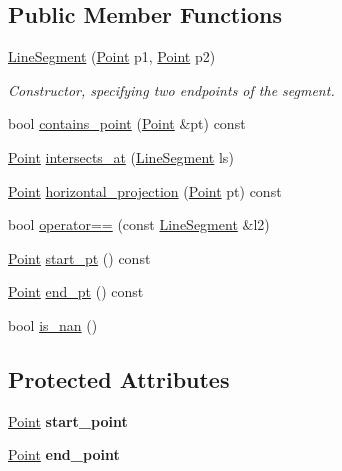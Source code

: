 \subsection*{Public Member Functions}
\begin{DoxyCompactItemize}
\item 
\hyperlink{classLineSegment_a691e185edf3aa7e2dc12307f9ef4be6b}{Line\+Segment} (\hyperlink{classPoint}{Point} p1, \hyperlink{classPoint}{Point} p2)
\begin{DoxyCompactList}\small\item\em Constructor, specifying two endpoints of the segment. \end{DoxyCompactList}\item 
bool \hyperlink{classLineSegment_a1b18c795d8c3c6f2724074062967671e}{contains\+\_\+point} (\hyperlink{classPoint}{Point} \&pt) const
\item 
\hyperlink{classPoint}{Point} \hyperlink{classLineSegment_a3bdc73ce4696a76b7c7dd143556c95b6}{intersects\+\_\+at} (\hyperlink{classLineSegment}{Line\+Segment} ls)
\item 
\hyperlink{classPoint}{Point} \hyperlink{classLineSegment_a51a9d2fcca6b3ff03cb51fd4d8fae4ba}{horizontal\+\_\+projection} (\hyperlink{classPoint}{Point} pt) const
\item 
bool \hyperlink{classLineSegment_ae73906b7230adbccf243c4b8dc6482b3}{operator==} (const \hyperlink{classLineSegment}{Line\+Segment} \&l2)
\item 
\hyperlink{classPoint}{Point} \hyperlink{classLineSegment_abe9136323cfe46be663907cbc1e3da2d}{start\+\_\+pt} () const
\item 
\hyperlink{classPoint}{Point} \hyperlink{classLineSegment_aa6c90340de500bb72bdde2114f838d57}{end\+\_\+pt} () const
\item 
bool \hyperlink{classLineSegment_a3364f7089cf7b650efe389475ddd0f12}{is\+\_\+nan} ()
\end{DoxyCompactItemize}
\subsection*{Protected Attributes}
\begin{DoxyCompactItemize}
\item 
\mbox{\label{classLineSegment_ad0b0d8deb67c29a21dc5f7685a7ca944}} 
\hyperlink{classPoint}{Point} {\bfseries start\+\_\+point}
\item 
\mbox{\label{classLineSegment_a45fe4522c4f0a050f0103d1e8475fc14}} 
\hyperlink{classPoint}{Point} {\bfseries end\+\_\+point}
\end{DoxyCompactItemize}
